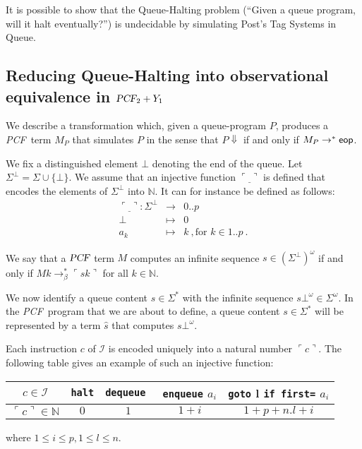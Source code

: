 \documentclass{article}
\newcommand{\encode}[1]{\ulcorner #1 \urcorner}
\newcommand{\nat}{\mathbb{N}}
\newcommand\eop{{\sf eop}}
\newcommand{\betared}{\rightarrow_\beta}
\newcommand\pcf{\textsl{PCF}}
\begin{document}
It is possible to show that the Queue-Halting problem (``Given a queue program, will it halt eventually?'') is undecidable by simulating Post's Tag Systems in Queue.

\subsection{Reducing Queue-Halting into observational equivalence in $\pcf_2 + Y_1$}

We describe a transformation which, given a queue-program $P$, produces a \pcf\ term $M_P$ that simulates $P$ in the sense that $P \Downarrow$ if and only if $M_P \rightarrow^* \eop$.

We fix a distinguished element $\bot$ denoting the end of the queue. Let $\Sigma^\bot = \Sigma \cup \{ \bot \}$. We assume that an injective function $\encode{\underline{\ }}$ is defined that encodes  the
elements of $\Sigma^\bot$ into $\nat$. It can for instance be defined as follows:
\begin{eqnarray*}
\encode{\underline{\ }} : \Sigma^\bot &\longrightarrow& 0..p \\
 \bot &\mapsto& 0 \\
 a_k &\mapsto& k \ , \mbox{for } k \in 1..p \ .
\end{eqnarray*}

We say that a $\pcf$ term $M$ computes an infinite sequence $s \in {(\Sigma^\bot)}^\omega$ if and only if 
$M k \betared^* \encode{s k}$ for all $k\in \nat$.

We now identify a queue content $s \in \Sigma^*$ with the infinite sequence $s \bot^\omega \in \Sigma^\omega$. In the \pcf\ program that we are about to define, a queue content $s \in \Sigma^*$ will be represented by a term $\hat{s}$ that computes $s \bot^\omega$.

Each instruction $c$ of $\mathcal{I}$ is encoded uniquely into a natural number $\encode{ c }$. The following table gives an example of such an injective function:
\begin{center}
\begin{tabular}{c|c|c|c|c}
$c \in \mathcal{I}$ & {\tt halt} & {\tt dequeue } & {\tt enqueue} $a_i$ &  {\tt goto} l {\tt if first=} $a_i$ \\ \hline
$\encode{ c } \in \nat$ & $0$ & $1$ & $1+i$ & $1+p + n.l +i$ \\
\end{tabular} 
\end{center}
where $1 \leq i \leq p, 1 \leq l \leq n$.
\end{document}
